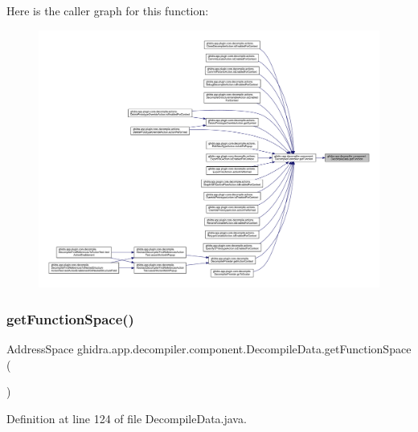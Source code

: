 Here is the caller graph for this function\+:
\nopagebreak
\begin{figure}[H]
\begin{center}
\leavevmode
\includegraphics[width=350pt]{classghidra_1_1app_1_1decompiler_1_1component_1_1_decompile_data_a344a21308e8c0e6343e89093be319ac9_icgraph}
\end{center}
\end{figure}
\mbox{\label{classghidra_1_1app_1_1decompiler_1_1component_1_1_decompile_data_a615d95992bf1abc8bee6b75cd6c0f663}} 
\subsubsection{\texorpdfstring{getFunctionSpace()}{getFunctionSpace()}}
{\footnotesize\ttfamily Address\+Space ghidra.\+app.\+decompiler.\+component.\+Decompile\+Data.\+get\+Function\+Space (\begin{DoxyParamCaption}{ }\end{DoxyParamCaption})\hspace{0.3cm}{\ttfamily [inline]}}



Definition at line 124 of file Decompile\+Data.\+java.


